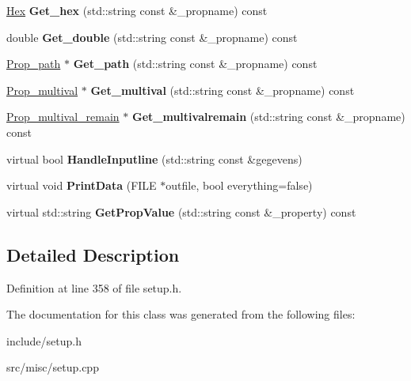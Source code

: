 \begin{DoxyCompactItemize}
\item 
\hypertarget{classSection__prop_a27ea3faaa366883d57485239eca1fc48}{\hyperlink{classHex}{Hex} {\bfseries Get\-\_\-hex} (std\-::string const \&\-\_\-propname) const }\label{classSection__prop_a27ea3faaa366883d57485239eca1fc48}

\item 
\hypertarget{classSection__prop_ac7dd360e460d869bdcaa531693249a22}{double {\bfseries Get\-\_\-double} (std\-::string const \&\-\_\-propname) const }\label{classSection__prop_ac7dd360e460d869bdcaa531693249a22}

\item 
\hypertarget{classSection__prop_a8522e241de9dfcf71331b6f1dbc16841}{\hyperlink{classProp__path}{Prop\-\_\-path} $\ast$ {\bfseries Get\-\_\-path} (std\-::string const \&\-\_\-propname) const }\label{classSection__prop_a8522e241de9dfcf71331b6f1dbc16841}

\item 
\hypertarget{classSection__prop_a4471da0d01d645126b419f3698b2975c}{\hyperlink{classProp__multival}{Prop\-\_\-multival} $\ast$ {\bfseries Get\-\_\-multival} (std\-::string const \&\-\_\-propname) const }\label{classSection__prop_a4471da0d01d645126b419f3698b2975c}

\item 
\hypertarget{classSection__prop_abbb6160985f12a56526911ab1de6f8ed}{\hyperlink{classProp__multival__remain}{Prop\-\_\-multival\-\_\-remain} $\ast$ {\bfseries Get\-\_\-multivalremain} (std\-::string const \&\-\_\-propname) const }\label{classSection__prop_abbb6160985f12a56526911ab1de6f8ed}

\item 
\hypertarget{classSection__prop_aa18fa3fb45cdc41e54a15f1416a43914}{virtual bool {\bfseries Handle\-Inputline} (std\-::string const \&gegevens)}\label{classSection__prop_aa18fa3fb45cdc41e54a15f1416a43914}

\item 
\hypertarget{classSection__prop_aa49bc0d729b288d862e1db9cfc6e107c}{virtual void {\bfseries Print\-Data} (F\-I\-L\-E $\ast$outfile, bool everything=false)}\label{classSection__prop_aa49bc0d729b288d862e1db9cfc6e107c}

\item 
\hypertarget{classSection__prop_a6b6444bff385109361d271103aafdd4e}{virtual std\-::string {\bfseries Get\-Prop\-Value} (std\-::string const \&\-\_\-property) const }\label{classSection__prop_a6b6444bff385109361d271103aafdd4e}

\end{DoxyCompactItemize}


\subsection{Detailed Description}


Definition at line 358 of file setup.\-h.



The documentation for this class was generated from the following files\-:\begin{DoxyCompactItemize}
\item 
include/setup.\-h\item 
src/misc/setup.\-cpp\end{DoxyCompactItemize}
